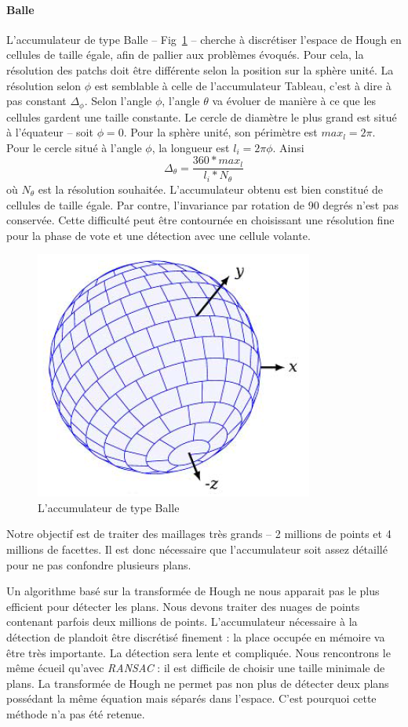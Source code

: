 ﻿\documentclass[12pt, twoside]{article}
\begin{document}
\paragraph{Balle}
L’accumulateur de type Balle -- Fig~\ref{fig:Ball} -- cherche à discrétiser l’espace de Hough en cellules de taille égale, afin de pallier aux problèmes évoqués. Pour cela, la résolution des patchs doit être différente selon la position sur la sphère unité. La résolution selon $\phi$ est semblable à celle de l’accumulateur Tableau, c’est à dire à pas constant $\Delta_{\phi}$. Selon l’angle $\phi$, l’angle $\theta$ va évoluer de manière à ce que les cellules gardent une taille constante. Le cercle de diamètre le plus grand est situé à l’équateur -- soit $\phi = 0$. Pour la sphère unité, son périmètre est $max_l = 2\pi$. Pour le cercle situé à l’angle $\phi$, la longueur est $l_i = 2\pi \phi$. Ainsi
$$\Delta_{\theta} = \dfrac{360*max_l}{l_i*N_{\theta}}$$
où $N_{\theta}$ est la résolution souhaitée. L’accumulateur obtenu est bien constitué de cellules de taille égale. Par contre, l’invariance par rotation de 90 degrés n’est pas conservée. Cette difficulté peut être contournée en choisissant une résolution fine pour la phase de vote et une détection avec une cellule volante.

\begin{figure}[h]
\centering
\includegraphics[scale=0.65]{Ball.png}
\caption{\label{fig:Ball} L'accumulateur de type Balle}
\end{figure}

Notre objectif est de traiter des maillages très grands -- 2 millions de points et 4 millions de facettes. Il est donc nécessaire que l'accumulateur soit assez détaillé pour ne pas confondre plusieurs plans.

Un algorithme basé sur la transformée de Hough ne nous apparait pas le plus efficient pour détecter les plans. Nous devons traiter des nuages de points contenant parfois deux millions de points. L'accumulateur nécessaire à la détection de plandoit être discrétisé finement : la place occupée en mémoire va être très importante. La détection sera lente et compliquée. Nous rencontrons le même écueil qu'avec \textit{RANSAC} : il est difficile de choisir une taille minimale de plans. La transformée de Hough ne permet pas non plus de détecter deux plans possédant la même équation mais séparés dans l'espace. C'est pourquoi cette méthode n'a pas été retenue. 
\end{document}
